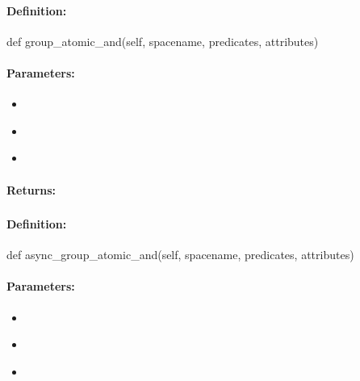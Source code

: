 \paragraph{Definition:}
\begin{pythoncode}
def group_atomic_and(self, spacename, predicates, attributes)
\end{pythoncode}

\paragraph{Parameters:}
\begin{itemize}[noitemsep]
\item {}\\

\item {}\\

\item {}\\

\end{itemize}

\paragraph{Returns:}


\pagebreak
\subsubsection{}
\label{api:python:async_group_atomic_and}


\paragraph{Definition:}
\begin{pythoncode}
def async_group_atomic_and(self, spacename, predicates, attributes)
\end{pythoncode}

\paragraph{Parameters:}
\begin{itemize}[noitemsep]
\item {}\\

\item {}\\

\item {}\\

\end{itemize}

